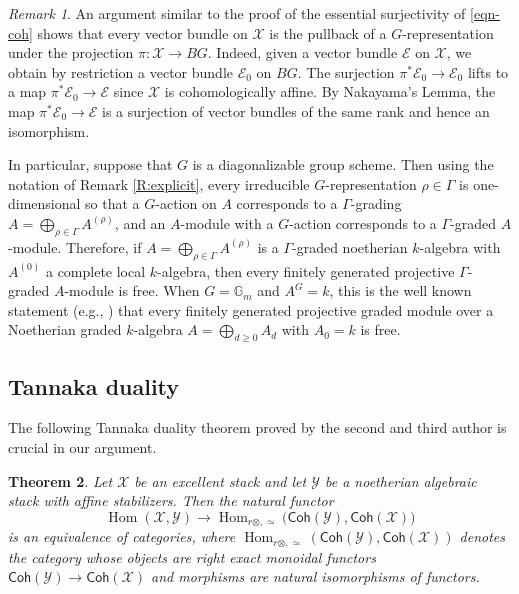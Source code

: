 \documentclass[a4paper]{amsart}
\theoremstyle{plain}
\newtheorem{theorem}{Theorem}[section]
\theoremstyle{definition}
\theoremstyle{remark}
\newtheorem{remark}[theorem]{Remark}
\numberwithin{equation}{section}
\newcommand{\GG}{\mathbb{G}}
\newcommand\cE{\mathcal{E}}
\newcommand\cX{\mathcal{X}}
\newcommand\cY{\mathcal{Y}}
\newcommand\co{\colon}
\newcommand\Coh{\mathsf{Coh}}
\DeclareMathOperator{\Hom}{Hom}
\begin{document}
 \begin{remark}  
An argument similar to the proof of the essential surjectivity of \eqref{eqn-coh} shows that every vector bundle on $\cX$ is the pullback of a $G$-representation under the projection $\pi \co \cX \to BG$.  Indeed,  given a vector bundle $\cE$ on $\cX$, we obtain by restriction a vector bundle $\cE_0$ on $BG$. 
The surjection $\pi^* \cE_0 \to \cE_0$ lifts to a map $\pi^* \cE_0 \to \cE$ since $\cX$ is cohomologically affine.  By Nakayama's Lemma, the map $\pi^* \cE_0 \to \cE$ is a surjection of vector bundles of the same rank and hence an isomorphism.

In particular, suppose that $G$ is a diagonalizable group scheme.  Then using the notation of Remark \ref{R:explicit}, every irreducible $G$-representation $\rho \in \Gamma$ is one-dimensional so that a $G$-action on $A$  corresponds to a $\Gamma$-grading $A = \bigoplus_{\rho \in \Gamma} A^{(\rho)}$, and an $A$-module with a $G$-action corresponds to a $\Gamma$-graded $A$-module.  
Therefore, if $A = \bigoplus_{\rho \in \Gamma} A^{(\rho)}$ is a $\Gamma$-graded noetherian $k$-algebra with $A^{(0)}$ a complete local $k$-algebra, then every finitely generated projective $\Gamma$-graded $A$-module is free.  When $G = \GG_m$ and $A^G=k$, this is the well known statement (e.g., \cite[Thm.~19.2]{eisenbud}) that every finitely generated projective graded module over a Noetherian graded $k$-algebra $A = \bigoplus_{d \ge 0} A_d$ with $A_0 = k$ is free.
\end{remark}

\subsection{Tannaka duality}
The following Tannaka duality theorem proved by the second and third author is crucial in our argument.

\begin{theorem}\cite[Thm.~1.1]{hallj_dary_coherent_tannakian_duality} \label{T:tannakian}
Let $\cX$ be an excellent stack and let $\cY$ be a noetherian algebraic stack with affine stabilizers.  Then the natural functor
$$\Hom(\cX, \cY) \to \Hom_{r\otimes, \simeq}\bigl(\Coh(\cY), \Coh(\cX)\bigr)$$
 is an equivalence of categories, where $\Hom_{r\otimes, \simeq}(\Coh(\cY), \Coh(\cX))$ denotes the category whose objects are right exact monoidal functors $\Coh(\cY) \to \Coh(\cX)$ and morphisms are natural isomorphisms of functors. 
\end{theorem}
\end{document}
